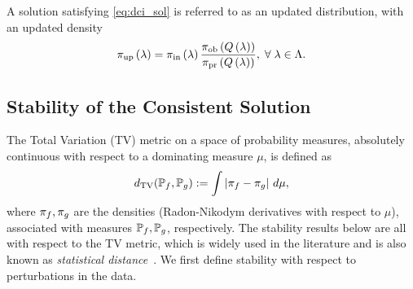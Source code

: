\begin{defn}\label{defn:updated}
  A solution satisfying \eqref{eq:dci_sol} is referred to as an updated distribution, with an updated density
  \begin{equation}\label{eq:update}
    \operatorname*{\pi_{up}} \left ( \lambda \right ) = \operatorname*{\pi_{in}} \left ( \lambda \right ) \frac{\operatorname*{\pi_{ob}} \left ( Q\left ( \lambda \right ) \right ) }{\operatorname*{\pi_{pr}} \left ( Q\left ( \lambda \right ) \right ) }, \; \forall \; \lambda \in {\Lambda}.
  \end{equation}
\end{defn}




\subsection{Stability of the Consistent Solution}\label{sec:stability}
The Total Variation (TV) metric on a space of probability measures, absolutely continuous with respect to a dominating measure $\mu$, is defined as
\begin{equation}\label{eq:tv}
d_{\text{TV}} (\mathbb{P}_f, \mathbb{P}_g) := \int \left\vert\pi_f - \pi_g\right\vert \, d\mu,
\end{equation}
where $\pi_f,\pi_g$ are the densities (Radon-Nikodym derivatives with respect to $\mu$), associated with measures $\mathbb{P}_f, \mathbb{P}_g$, respectively.
The stability results below are all with respect to the TV metric, which is widely used in the literature and is also known as \emph{statistical distance}~\citep{GS02, Smith, Silverman}.
We first define stability with respect to perturbations in the data.


